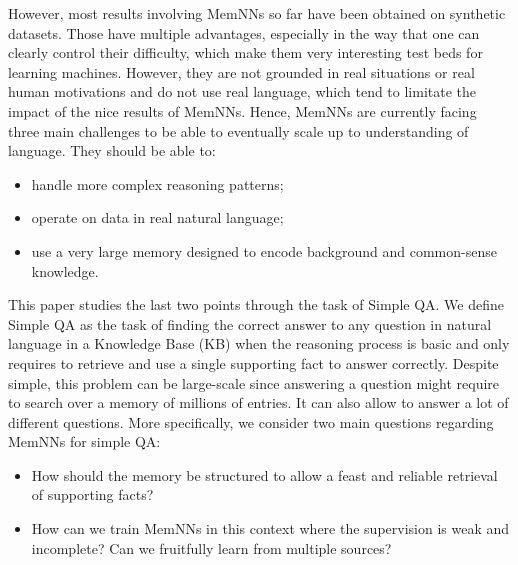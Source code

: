 \documentclass[11pt,a4paper]{article}
\begin{document}
However, most results involving MemNNs so far have been obtained on
synthetic datasets.  Those have multiple advantages,
especially in the way that one can clearly control their
difficulty, which make them very interesting test beds for learning machines.
However, they are not grounded in real situations or real human
motivations and do not use real language, which tend to limitate the
impact of the nice results of MemNNs.
Hence, MemNNs are currently facing three main challenges to
be able to eventually scale up to understanding of language. They
should be able to:
\begin{itemize}
\item handle more complex reasoning patterns;
\item operate on data in real natural language;
\item use a very large memory designed to encode background and
  common-sense knowledge.
\end{itemize}

This paper studies the last two points through the task of Simple QA.
We define Simple QA as the task of finding the correct answer to any
question in natural language in a Knowledge Base (KB) when the reasoning
process is basic and only requires to retrieve and use a single
supporting fact to answer correctly.
Despite simple, this problem can be large-scale since answering a
question might require to search over a memory of millions of entries.
It can also allow to answer a lot of different questions.
More specifically, we consider two main questions regarding MemNNs for
simple QA:
\begin{itemize}
\item
How should the memory be structured to allow a feast and reliable
retrieval of supporting facts?
\item
How can we train MemNNs in this context where the supervision is weak
and incomplete? Can we fruitfully learn from multiple sources?
\end{itemize}
\end{document}

